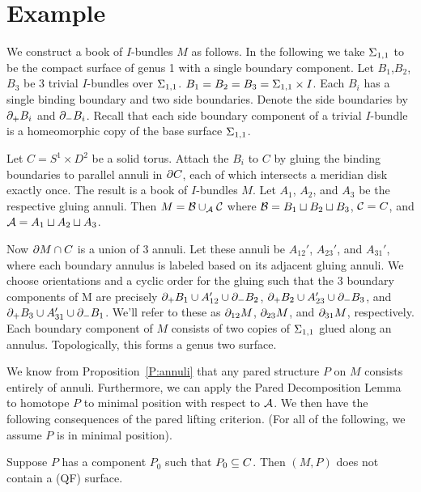 \section{Example}

We construct a book of $I$-bundles $M$ as follows. In the following we take
$\Sigma_{1,1}$ to be the compact surface of genus 1 with a single boundary
component. Let $B_1$,$B_2$,$B_3$ be 3 trivial $I$-bundles over $\Sigma_{1,1}$.
$B_1=B_2=B_3=\Sigma_{1,1}\times I$. Each $B_i$ has a single binding boundary and two
side boundaries. Denote the side boundaries by $\partial_+B_i$ and $\partial_-B_i$.
Recall that each side boundary component of a trivial $I$-bundle is
a homeomorphic copy of the base surface $\Sigma_{1,1}$.

Let $C = S^1\times D^2$ be a solid torus. Attach the $B_i$ to $C$ by gluing the
binding boundaries to parallel annuli in $\partial C$, each of which intersects
a meridian disk exactly once. The result is a book of $I$-bundles $M$. Let
$A_1$, $A_2$, and $A_3$ be the respective gluing annuli. Then $M=\mathcal{B}\cup_{\mathcal{A}}
\mathcal{C}$ where $\mathcal{B}=B_1 \sqcup B_2 \sqcup B_3$, $\mathcal{C}=C$, and $\mathcal{A} = A_1 \sqcup A_2
\sqcup A_3$.

Now $\partial M \cap C$ is a union of 3 annuli. Let these annuli be $A_{12}'$,
$A_{23}'$, and $A_{31}'$, where each boundary annulus is labeled based on its
adjacent gluing annuli. We choose orientations and a cyclic order for the
gluing such that the 3 boundary components of M are precisely $\partial_+B_1 \cup
A_{12}' \cup \partial_-B_2$, $\partial_+B_2 \cup A_{23}' \cup \partial_-B_3$, and $\partial_+B_3
\cup A_{31}' \cup \partial_-B_1$. We'll refer to these as $\partial_{12}M$, $\partial_{23}M$,
and $\partial_{31}M$, respectively.  Each boundary component of $M$ consists of two
copies of $\Sigma_{1,1}$ glued along an annulus. Topologically, this forms a genus
two surface.

We know from Proposition~\ref{P:annuli} that any pared structure $P$ on $M$
consists entirely of annuli. Furthermore, we can apply the Pared Decomposition
Lemma to homotope $P$ to minimal position with respect to $\mathcal{A}$. We then have
the following consequences of the pared lifting criterion. (For all of the
following, we assume $P$ is in minimal position).

\begin{prop}

Suppose $P$ has a component $P_0$ such that $P_0 \subseteq C$. Then $(M,P)$ does not
contain a (QF) surface.

\end{prop}

